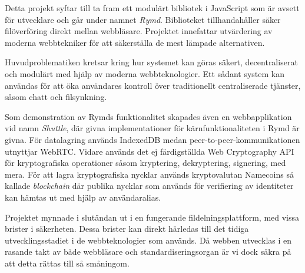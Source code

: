 Detta projekt syftar till ta fram ett modulärt bibliotek i JavaScript som är avsett för utvecklare och går under namnet \emph{Rymd}. Biblioteket tillhandahåller säker filöverföring direkt mellan webbläsare. Projektet innefattar utvärdering av moderna webbtekniker för att säkerställa de mest lämpade alternativen.

Huvudproblematiken kretsar kring hur systemet kan göras säkert, decentraliserat och modulärt med hjälp av moderna webbteknologier. Ett sådant system kan användas för att öka användares kontroll över traditionellt centraliserade tjänster, såsom chatt och filsynkning.

Som demonstration av Rymds funktionalitet skapades även en webbapplikation vid namn \emph{Shuttle}, där givna implementationer för kärnfunktionaliteten i Rymd är givna. För datalagring används IndexedDB medan peer-to-peer-kommunikationen utnyttjar WebRTC. Vidare används det ej färdigställda Web Cryptography API för kryptografiska operationer såsom kryptering, dekryptering, signering, med mera. För att lagra kryptografiska nycklar används kryptovalutan Namecoins så kallade \emph{blockchain} där publika nycklar som används för verifiering av identiteter kan hämtas ut med hjälp av användaralias.

Projektet mynnade i slutändan ut i en fungerande fildelningsplattform, med vissa brister i säkerheten. Dessa brister kan direkt härledas till det tidiga utvecklingsstadiet i de webbteknologier som används. Då webben utvecklas i en rasande takt av både webbläsare och standardiseringsorgan är vi dock säkra på att detta rättas till så småningom.
